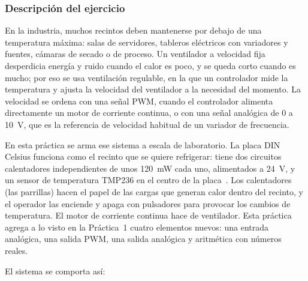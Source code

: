 \documentclass[12pt,a4paper]{article}
\begin{document}
\subsubsection{Descripción del ejercicio}
\label{subsubsec:p2_desc}

En la industria, muchos recintos deben mantenerse por debajo de una
temperatura máxima: salas de servidores, tableros eléctricos con
variadores y fuentes, cámaras de secado o de proceso. Un ventilador a
velocidad fija desperdicia energía y ruido cuando el calor es poco, y se
queda corto cuando es mucho; por eso se usa ventilación regulable, en la
que un controlador mide la temperatura y ajusta la velocidad del
ventilador a la necesidad del momento. La velocidad se ordena con una
señal PWM, cuando el controlador alimenta directamente un motor de
corriente continua, o con una señal analógica de 0 a 10~V, que es la
referencia de velocidad habitual de un variador de frecuencia.

En esta práctica se arma ese sistema a escala de laboratorio. La placa DIN
Celsius funciona como el recinto que se quiere refrigerar: tiene dos
circuitos calentadores independientes de unos 120~mW cada uno, alimentados
a 24~V, y un sensor de temperatura TMP236 en el centro de la
placa~\cite{celsius}. Los calentadores (las parrillas) hacen el papel de
las cargas que generan calor dentro del recinto, y el operador las
enciende y apaga con pulsadores para provocar los cambios de temperatura.
El motor de corriente continua hace de ventilador. Esta práctica agrega a
lo visto en la Práctica~1 cuatro elementos nuevos: una entrada analógica,
una salida PWM, una salida analógica y aritmética con números reales.

El sistema se comporta así:
\end{document}
